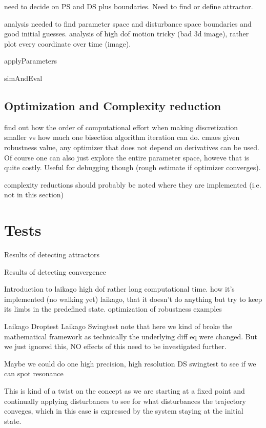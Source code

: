     need to decide on PS and DS plus boundaries. Need to find or define attractor. 

    analysis needed to find parameter space and disturbance space boundaries and good initial guesses.
    analysis of high dof motion tricky (bad 3d image), rather plot every coordinate over time (image). 

    applyParameters

    simAndEval

\subsection{Optimization and Complexity reduction}
    

    find out how the order of computational effort when making discretization smaller vs how much one bisection algorithm iteration can do. 
    cmaes
    given robustness value, any optimizer that does not depend on derivatives can be used. 
    Of course one can also just explore the entire parameter space, howeve that is quite costly. Useful for debugging though (rough estimate if optimizer converges).

    complexity reductions should probably be noted where they are implemented (i.e. not in this section)

\section{Tests}

    
    Results of detecting attractors



    Results of detecting convergence

    Introduction to laikago
        high dof
        rather long computational time. 
        how it's implemented (no walking yet) laikago, that it doesn't do anything but try to keep its limbs in the predefined state.  
    optimization of robustness examples

    Laikago Droptest
    Laikago Swingtest
        note that here we kind of broke the mathematical framework as technically the underlying diff eq were changed. But we just ignored this, NO effects of this need to be investigated further. 


        Maybe we could do one high precision, high resolution DS swingtest to see if we can spot resonance 


    This is kind of a twist on the concept as we are starting at a fixed point and continually applying disturbances to see for what disturbances the trajectory conveges, which in this case is expressed by the system staying at the initial state. 


















